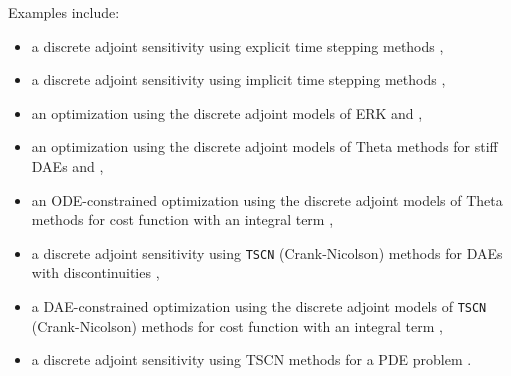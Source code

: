 Examples
include:
\begin{itemize}
\item a discrete adjoint sensitivity using explicit time stepping
  methods \href{http://www.mcs.anl.gov/petsc/petsc-current/src/ts/examples/tutorials/ex16adj.c.html}{},
\item a discrete adjoint sensitivity using implicit time stepping
  methods \href{http://www.mcs.anl.gov/petsc/petsc-current/src/ts/examples/tutorials/ex20adj.c.html}{},
\item an optimization using the discrete adjoint models of ERK
  \href{http://www.mcs.anl.gov/petsc/petsc-current/src/ts/examples/tutorials/ex16opt_ic.c.html}{} and \href{http://www.mcs.anl.gov/petsc/petsc-current/src/ts/examples/tutorials/ex16opt_p.c.html}{},
\item an optimization using the discrete adjoint models of Theta
methods for stiff DAEs
    \href{http://www.mcs.anl.gov/petsc/petsc-current/src/ts/examples/tutorials/ex20opt_ic.c.html}{} and \href{http://www.mcs.anl.gov/petsc/petsc-current/src/ts/examples/tutorials/ex20opt_p.c.html}{},
\item an ODE-constrained optimization using the discrete adjoint
  models of Theta methods for cost function with an integral term \href{http://www.mcs.anl.gov/petsc/petsc-current/src/ts/examples/tutorials/power_grid/ex3opt.c.html}{},
\item a discrete adjoint sensitivity using \lstinline{TSCN} (Crank-Nicolson)
  methods for DAEs with discontinuities \href{http://www.mcs.anl.gov/petsc/petsc-current/src/ts/examples/tutorials/power_grid/stability/stability_9bus/ex9busadj.c.html}{},
\item a DAE-constrained optimization using the discrete adjoint
models of \lstinline{TSCN} (Crank-Nicolson) methods for cost function with an
    integral term \href{http://www.mcs.anl.gov/petsc/petsc-current/src/ts/examples/tutorials/power_grid/stability/stability_9bus/ex9busopt.c.html}{},
\item a discrete adjoint sensitivity using TSCN methods for a
  PDE problem \href{http://www.mcs.anl.gov/petsc/petsc-current/src/ts/examples/tutorials/advection-diffusion-reaction/ex5adj.c.html}{}.
\end{itemize}

